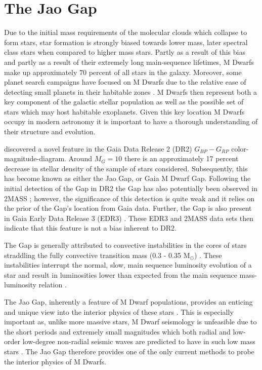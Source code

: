 \section{The Jao Gap}\label{sec:JOintro}
Due to the initial mass requirements of the molecular clouds which collapse to form
stars, star formation is strongly biased towards lower mass, later spectral
class stars when compared to higher mass stars. Partly as a result of this
bias and partly as a result of their extremely long main-sequence lifetimes,
M Dwarfs make up approximately 70 percent of all stars in the galaxy. Moreover,
some planet search campaigns have focused on M Dwarfs due to the relative ease
of detecting small planets in their habitable zones \citep[e.g.][]{Nut08}.
M Dwarfs then represent both a key component of the galactic stellar population
as well as the possible set of stars which may host habitable exoplanets.
Given this key location M Dwarfs occupy in modern astronomy it is important to
have a thorough understanding of their structure and evolution.

\citet{Jao2018} discovered a novel feature in the Gaia Data Release 2 (DR2)
$G_{BP}-G_{RP}$ color-magnitude-diagram. Around $M_{G}=10$ there is an
approximately 17 percent decrease in stellar density of the sample of stars
\citet{Jao2018} considered. Subsequently, this has become known as either the
Jao Gap, or Gaia M Dwarf Gap. Following the initial detection of the Gap in DR2
the Gap has also potentially been observed in 2MASS \citep{Skrutskie2006,
Jao2018}; however, the significance of this detection is quite weak and it
relies on the prior of the Gap's location from Gaia data. Further, the Gap is
also present in Gaia Early Data Release 3 (EDR3) \citep{Jao2021}. These EDR3
and 2MASS data sets then indicate that this feature is not a bias inherent to
DR2.

The Gap is generally attributed to convective instabilities in the cores of
stars straddling the fully convective transition mass (0.3 - 0.35 M$_{\odot}$)
\citep{Baraffe2018}. These instabilities interrupt the normal, slow, main
sequence luminosity evolution of a star and result in luminosities lower
than expected from the main sequence mass-luminosity relation \citep{Jao2020}.

The Jao Gap, inherently a feature of M Dwarf populations, provides an enticing
and unique view into the interior physics of these stars \citep{Feiden2021}.
This is especially important as, unlike more massive stars, M Dwarf seismology
is unfeasible due to the short periods and extremely small
magnitudes which both radial and low-order low-degree non-radial seismic waves
are predicted to have in such low mass stars \citep{Rodriguez-Lopez2019}. The
Jao Gap therefore provides one of the only current methods to probe the
interior physics of M Dwarfs.

